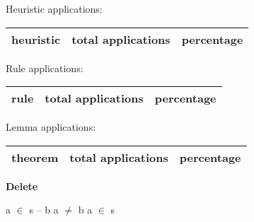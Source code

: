 \documentclass[a4paper]{article}
\begin{document}
\medskip


Heuristic applications:

\begin{supertabular}{l|r|r}
heuristic	& total applications & percentage \\ \hline

\end{supertabular}

Rule applications:

\begin{supertabular}{l|r|r}
rule	        & total applications & percentage \\ \hline

\end{supertabular}

Lemma applications:

\begin{supertabular}{l|r|r}
theorem	        & total applications & percentage \\ \hline

\end{supertabular}
\pagebreak

{\LARGE\bf Delete}\label{lemma-Delete}

\medskip

 \Fol a $\in$ s -- b \Equiv a $\neq$ b \And a $\in$ s
\end{document}
